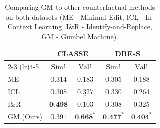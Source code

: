 \documentclass[letterpaper]{article} %
\newcommand{\mh}[1]{\textcolor{teal}{\bf [Hunter: #1]}}
\newcommand{\al}[1]{\textcolor{blue}{\bf [Alex: #1]}}
\begin{document}




\begin{table}[t]
\centering
\setlength{\tabcolsep}{3pt}
\begin{tabular}{l  cc  cc}
\toprule
& \multicolumn{2}{c}{\textbf{CLASSE}} & \multicolumn{2}{c}{\textbf{DREsS}} \\
\cmidrule(lr){2-3} \cmidrule(lr){4-5}
\multirow{-2}{*}{\textbf{Approach}} & $\text{Sim}^\uparrow$ & $\text{Val}^\uparrow$ & $\text{Sim}^\uparrow$ & $\text{Val}^\uparrow$ \\
\midrule
ME %
    & $0.314$ & $0.183$
    & $0.305$ & $0.188$ \\
ICL
    & $0.308$ & $\underline{0.327}$
    & $0.330$ & $0.264$ \\
I\&R %
    & $\textbf{0.498}$ & $0.103$
    & $0.308$ & $0.325$ \\
GM (Ours)
    & $\underline{0.391}$ & $\textbf{0.668}^{*}$
    & $\textbf{0.477}^{*}$ & $\textbf{0.404}^{*}$ \\
\bottomrule
\end{tabular}
\caption{Comparing GM to other counterfactual methods on both datasets (ME - Minimal-Edit, ICL - In-Context Learning, I\&R - Identify-and-Replace, GM - Gumbel Machine).}
\label{tab:llama_results}
\vspace{0cm}
\end{table}
\end{document}

